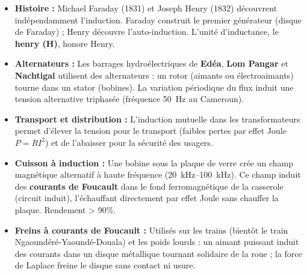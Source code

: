 \documentclass[11pt]{article}
\begin{document}
\begin{savaistu}
\begin{itemize}
\item \textbf{Histoire :} Michael Faraday (1831) et Joseph Henry (1832) découvrent indépendamment l'induction. Faraday construit le premier générateur (disque de Faraday) ; Henry découvre l'auto-induction. L'unité d'inductance, le \textbf{henry (H)}, honore Henry.
\item \textbf{Alternateurs :} Les barrages hydroélectriques de \textbf{Edéa}, \textbf{Lom Pangar} et \textbf{Nachtigal} utilisent des alternateurs : un rotor (aimants ou électroaimants) tourne dans un stator (bobines). La variation périodique du flux induit une tension alternative triphasée (fréquence \SI{50}{Hz} au Cameroun).
\item \textbf{Transport et distribution :} L'induction mutuelle dans les transformateurs permet d'élever la tension pour le transport (faibles pertes par effet Joule $P = R I^2$) et de l'abaisser pour la sécurité des usagers.
\item \textbf{Cuisson à induction :} Une bobine sous la plaque de verre crée un champ magnétique alternatif à haute fréquence (\SIrange{20}{100}{kHz}). Ce champ induit des \textbf{courants de Foucault} dans le fond ferromagnétique de la casserole (circuit induit), l'échauffant directement par effet Joule sans chauffer la plaque. Rendement > 90\%.
\item \textbf{Freins à courants de Foucault :} Utilisés sur les trains (bientôt le train Ngaoundéré-Yaoundé-Douala) et les poids lourds : un aimant puissant induit des courants dans un disque métallique tournant solidaire de la roue ; la force de Laplace freine le disque sans contact ni usure.
\end{itemize}
\end{savaistu}
\end{document}

